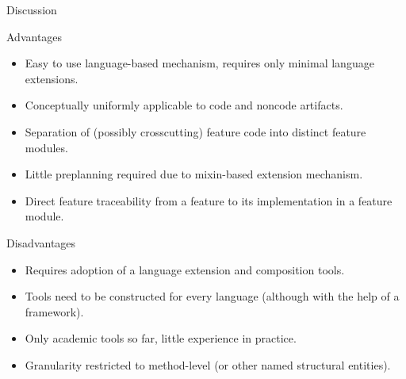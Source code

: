 \begin{frame}{Discussion}
	\begin{mycolumns}
		\begin{note}{Advantages}
			\begin{itemize}
				\item Easy to use language-based mechanism, requires only minimal language extensions.
				\item Conceptually uniformly applicable to code and noncode artifacts.
				\item Separation of (possibly crosscutting) feature code into distinct feature modules.
				\item Little preplanning required due to mixin-based extension mechanism.
				\item Direct feature traceability from a feature to its implementation in a feature module.
			\end{itemize}
		\end{note}
	\mynextcolumn
		\begin{note}{Disadvantages}
			\begin{itemize}
				\item Requires adoption of a language extension and composition tools.
				\item Tools need to be constructed for every language (although with the help of a framework).
				\item Only academic tools so far, little experience in practice.
				\item Granularity restricted to method-level (or other named structural entities).
			\end{itemize}
		\end{note}
	\end{mycolumns}
\end{frame}

